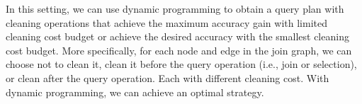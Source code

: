 In this setting, we can use dynamic programming to obtain a query plan with cleaning operations that achieve the maximum accuracy gain with limited cleaning cost budget or achieve the desired accuracy with the smallest cleaning cost budget. More specifically, for each node and edge in the join graph, we can choose not to clean it, clean it before the query operation (i.e., join or selection), or clean after the query operation. Each with different cleaning cost. With dynamic programming, we can achieve an optimal strategy.
\fi


